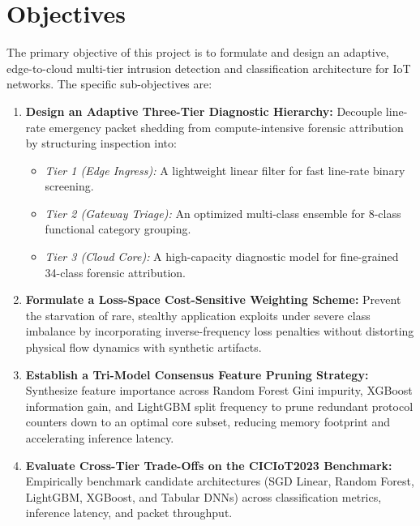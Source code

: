 \documentclass[12pt,a4paper]{report}
\begin{document}
\section{Objectives}
The primary objective of this project is to formulate and design an adaptive, edge-to-cloud multi-tier intrusion detection and classification architecture for IoT networks. The specific sub-objectives are:
\begin{enumerate}
    \item \textbf{Design an Adaptive Three-Tier Diagnostic Hierarchy:} Decouple line-rate emergency packet shedding from compute-intensive forensic attribution by structuring inspection into:
    \begin{itemize}
        \item \emph{Tier 1 (Edge Ingress):} A lightweight linear filter for fast line-rate binary screening.
        \item \emph{Tier 2 (Gateway Triage):} An optimized multi-class ensemble for 8-class functional category grouping.
        \item \emph{Tier 3 (Cloud Core):} A high-capacity diagnostic model for fine-grained 34-class forensic attribution.
    \end{itemize}
    \item \textbf{Formulate a Loss-Space Cost-Sensitive Weighting Scheme:} Prevent the starvation of rare, stealthy application exploits under severe class imbalance by incorporating inverse-frequency loss penalties without distorting physical flow dynamics with synthetic artifacts.
    \item \textbf{Establish a Tri-Model Consensus Feature Pruning Strategy:} Synthesize feature importance across Random Forest Gini impurity, XGBoost information gain, and LightGBM split frequency to prune redundant protocol counters down to an optimal core subset, reducing memory footprint and accelerating inference latency.
    \item \textbf{Evaluate Cross-Tier Trade-Offs on the CICIoT2023 Benchmark:} Empirically benchmark candidate architectures (SGD Linear, Random Forest, LightGBM, XGBoost, and Tabular DNNs) across classification metrics, inference latency, and packet throughput.
\end{enumerate}
\end{document}
